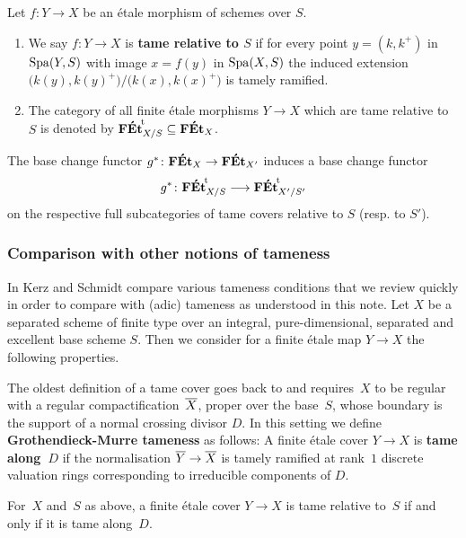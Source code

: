 \begin{defi}
\label{defi:tame cover of schemes X over S}
    Let $f\colon Y \to X$ be an \'etale morphism of schemes over $S$.   
    \begin{enumerate}
        \item 
        We say $f\colon Y \to X$ is \textbf{tame relative to $S$} if for every point $y = (k,k^+)$ in $\operatorname{Spa}(Y, S)$ with image $x = f(y)$ in $\operatorname{Spa}(X, S)$ the induced extension
        $
            \big(k(y),k(y)^+\big) / \big(k(x), k(x)^+\big)
        $
        is tamely ramified.
        \item 
        The category of all finite \'etale morphisms $Y\to X$ which are tame relative to $S$ is denoted by ${\mathbf{F\acute{E}t}}^{\!\mathrm{t}}_{X/S}\subseteq \mathbf{F\acute{E}t}_X$. 
    \end{enumerate}
\end{defi}

The base change functor $g^\ast \colon \mathbf{F\acute{E}t}_X \to \mathbf{F\acute{E}t}_{X'}$ induces a base change functor
\[
    g^\ast \colon {\mathbf{F\acute{E}t}}^{\!\mathrm{t}}_{X/S} \longrightarrow {\mathbf{F\acute{E}t}}^{\!\mathrm{t}}_{X'/S'}
\]
on the respective full subcategories of tame covers relative to $S$ (resp. to $S'$).


\subsubsection*{Comparison with other notions of tameness}

In \cite{KerzSchmidt2010:DifferentNotionsTameness} Kerz and Schmidt compare various tameness conditions that we review quickly in order to compare with (adic) tameness as understood in this note. 
Let $X$ be a separated scheme of finite type over an integral, pure-dimensional, separated and excellent base scheme $S$.
Then we consider for a finite \'etale map $Y \to X$ the following properties. 

The oldest definition of a tame cover goes back to \cite[Exposé~X]{SGA1} and requires~$X$ to be regular with a regular compactification~$\overline{X}$, proper over the base~$S$, whose boundary is the support of a normal crossing divisor $D$.
In this setting we define \textbf{Grothendieck-Murre tameness} as follows:
A finite étale cover $Y \to X$ is \textbf{tame along~$D$} if the normalisation $\overline{Y} \to \overline{X}$ is tamely ramified at rank~$1$ discrete valuation rings corresponding to irreducible components of $D$.

\begin{prop}
    For~$X$ and~$S$ as above, a finite étale cover $Y \to X$ is tame relative to~$S$ if and only if it is tame along~$D$.
\end{prop}

